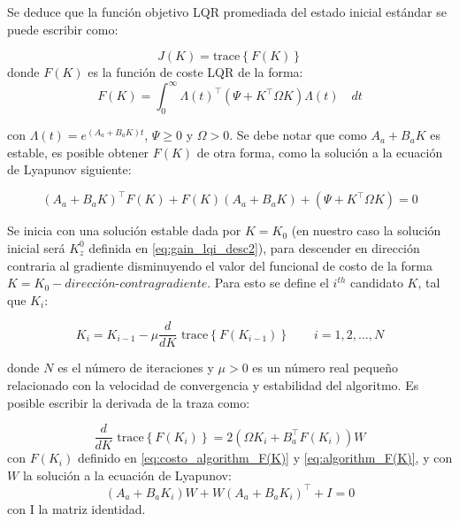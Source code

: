 Se deduce que la función objetivo LQR promediada del estado inicial estándar se puede escribir como:

\begin{equation}
    J(K) = \textrm{trace} \left\{ F(K) \right\}
\end{equation}
donde $F(K)$ es la función de coste LQR de la forma:
\begin{equation} \label{eq:costo_algorithm_F(K)}
    F(K) = \int_0^\infty \Lambda(t)^{\top} \left( \Psi + K^{\top} \Omega K \right) \Lambda(t) \quad dt
\end{equation}

con $\Lambda(t) = e^{(A_a+B_a K)t}$, $\Psi \geq 0$ y $\Omega > 0$. Se debe notar que como $A_a + B_a K$ es estable, es posible obtener $F(K)$ de otra forma, como la solución a la ecuación de Lyapunov siguiente:

\begin{equation} \label{eq:algorithm_F(K)}
    \left( A_a + B_a K \right)^{\top} F(K) + F(K) \left( A_a + B_a K \right) + \left( \Psi + K^{\top} \Omega K \right) = 0
\end{equation}

Se inicia con una solución estable dada por $K = K_0$ (en nuestro caso la solución inicial será $K_z^0$ definida en \ref{eq:gain_lqi_desc2}), para descender en dirección contraria al gradiente disminuyendo el valor del funcional de costo de la forma $K=K_0-\textit{dirección-contragradiente}$. Para esto se define el $i^{th}$ candidato $K$, tal que $K_i$:

\begin{equation}
    K_i = K_{i-1} - \mu \frac{d}{dK}\textrm{ trace}\left\{ F(K_{i-1}) \right\} \qquad i = 1,2,\hdots,N
\end{equation}

donde $N$ es el número de iteraciones y $\mu>0$ es un número real pequeño relacionado con la velocidad de convergencia y estabilidad del algoritmo. Es posible escribir la derivada de la traza como: 

\begin{equation}
    \frac{d}{dK} \textrm{ trace} \left\{F(K_i)\right\} = 2\left( \Omega K_i + B_a^{\top} F(K_i) \right) W
\end{equation}
con $F(K_i)$ definido en \ref{eq:costo_algorithm_F(K)} y \ref{eq:algorithm_F(K)}, y con $W$ la solución a la ecuación de Lyapunov:
\begin{equation}
    \left( A_a + B_a K_i \right) W + W \left( A_a + B_a K_i \right)^{\top} + I = 0
\end{equation}
con I la matriz identidad.

